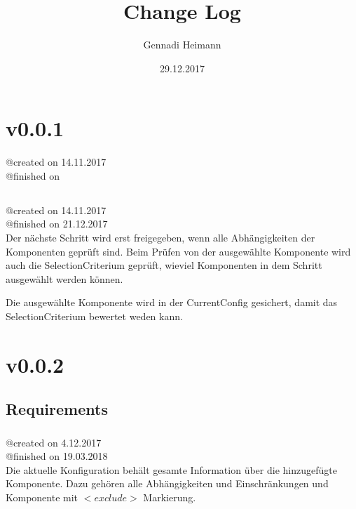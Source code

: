 \documentclass{article}
\begin{document}
\begin{titlepage}
\author{Gennadi Heimann} 
\title{Change Log} 
\date{29.12.2017} 
\maketitle
\end{titlepage}

\section{v0.0.1}
@created on 14.11.2017\\
@finished on \\

\subsection{}
@created on     14.11.2017\\
@finished on   21.12.2017\\

Der nächste Schritt wird erst freigegeben, wenn alle Abhängigkeiten 
der Komponenten geprüft sind. Beim Prüfen von der ausgewählte 
Komponente wird auch die SelectionCriterium geprüft, wieviel Komponenten 
in dem Schritt ausgewählt werden können.

Die ausgewählte Komponente wird in der CurrentConfig gesichert, damit das
SelectionCriterium bewertet weden kann.\\

\section{v0.0.2}

\subsection{Requirements}

\subsubsection{}
@created on     4.12.2017\\
@finished on   19.03.2018\\

Die aktuelle Konfiguration behält gesamte Information über die hinzugefügte
Komponente. Dazu gehören alle Abhängigkeiten und Einschränkungen und
Komponente mit $<exclude>$ Markierung.\\
\end{document}
